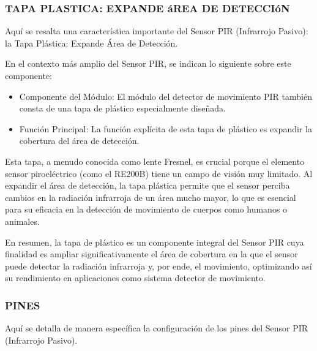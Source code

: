 \documentclass{report}
\begin{document}
\subsubsection{TAPA PLASTICA: EXPANDE áREA DE DETECCIóN}
Aquí se resalta una característica importante del Sensor PIR (Infrarrojo Pasivo): la Tapa Plástica: 
Expande Área de Detección.

En el contexto más amplio del Sensor PIR, se  indican lo siguiente sobre este componente:
\begin{itemize}
    \item Componente del Módulo: El módulo del detector de movimiento PIR también consta de una tapa de plástico especialmente diseñada.
    \item Función Principal: La función explícita de esta tapa de plástico es expandir la cobertura del área de detección.
\end{itemize}

Esta tapa, a menudo conocida como lente Fresnel, es crucial porque el elemento sensor piroeléctrico (como el RE200B) tiene un campo de visión muy limitado. 
Al expandir el área de detección, la tapa plástica permite que el sensor perciba cambios en la radiación infrarroja de un área mucho mayor, lo que es 
esencial para su eficacia en la detección de movimiento de cuerpos como humanos o animales.

En resumen, la tapa de plástico es un componente integral del Sensor PIR cuya finalidad es ampliar significativamente el área de cobertura 
en la que el sensor puede detectar la radiación infrarroja y, por ende, el movimiento, optimizando así su rendimiento en aplicaciones como  
sistema detector de movimiento.

\subsubsection{PINES}
Aquí se detalla de manera específica la configuración de los pines del Sensor PIR (Infrarrojo Pasivo).
\end{document}
